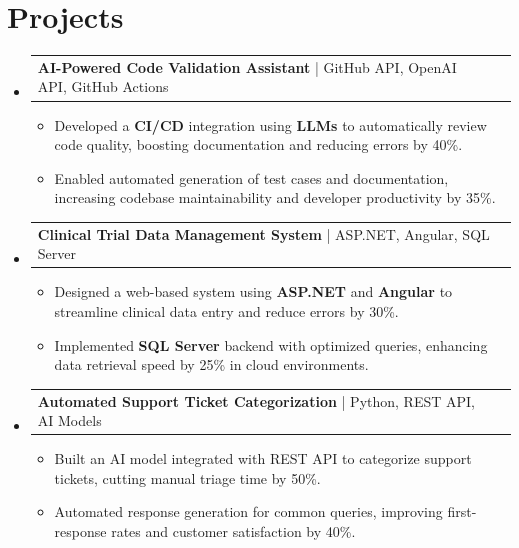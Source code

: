 \documentclass[letterpaper,11pt]{article}
\makeatletter
\newcommand{\resumeItem}[1]{
  \item\footnotesize{
    {#1 \vspace{-2pt}}
  }
}
\newcommand{\resumeProjectHeading}[2]{
    \item
    \begin{tabular*}{1.001\textwidth}{l@{\extracolsep{\fill}}r}
      \small#1 & \textbf{\small #2}\\
    \end{tabular*}\vspace{-7pt}
}
\newcommand{\resumeSubHeadingListStart}{\begin{itemize}[leftmargin=0pt, label={}]}
\newcommand{\resumeSubHeadingListEnd}{\end{itemize}}
\newcommand{\resumeItemListStart}{\begin{itemize}[leftmargin=*]}
\newcommand{\resumeItemListEnd}{\end{itemize}\vspace{-5pt}}
\makeatother
\begin{document}
\section{Projects}
    \vspace{-5pt}
    \resumeSubHeadingListStart
      \resumeProjectHeading
          {\textbf{AI-Powered Code Validation Assistant} | GitHub API, OpenAI API, GitHub Actions}{}
          \resumeItemListStart
              \resumeItem{Developed a \textbf{CI/CD} integration using \textbf{LLMs} to automatically review code quality, boosting documentation and reducing errors by 40\%.}
              \resumeItem{Enabled automated generation of test cases and documentation, increasing codebase maintainability and developer productivity by 35\%.}
          \resumeItemListEnd
          \vspace{-12pt}
      \resumeProjectHeading
          {\textbf{Clinical Trial Data Management System} | ASP.NET, Angular, SQL Server}{}
          \resumeItemListStart
              \resumeItem{Designed a web-based system using \textbf{ASP.NET} and \textbf{Angular} to streamline clinical data entry and reduce errors by 30\%.}
              \resumeItem{Implemented \textbf{SQL Server} backend with optimized queries, enhancing data retrieval speed by 25\% in cloud environments.}
          \resumeItemListEnd
          \vspace{-12pt}
      \resumeProjectHeading
          {\textbf{Automated Support Ticket Categorization} | Python, REST API, AI Models}{}
          \resumeItemListStart
              \resumeItem{Built an AI model integrated with REST API to categorize support tickets, cutting manual triage time by 50\%.}
              \resumeItem{Automated response generation for common queries, improving first-response rates and customer satisfaction by 40\%.}
          \resumeItemListEnd 
    \resumeSubHeadingListEnd
\end{document}
